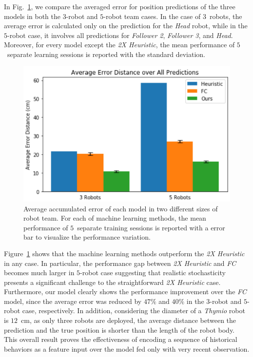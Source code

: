 \documentclass[letterpaper, 10 pt, conference]{ieeeconf}  %
\begin{document}
    In Fig.~\ref{fig:macro_eval}, we compare the averaged error for
    position predictions of the three models in both the $3$-robot and
    $5$-robot team cases. In the case of $3$~robots, the average error
    is calculated only on the prediction for the \emph{Head} robot,
    while in the $5$-robot case, it involves all predictions for
    \emph{Follower 2}, \emph{Follower 3}, and \emph{Head}. Moreover, for
    every model except the \emph{2X Heuristic}, the mean performance of
    $5$~separate learning sessions is reported with the standard
    deviation.
	\begin{figure}[t]
        \centering
        \includegraphics[width=1.\columnwidth]{fig_macro_eval}
        \caption{Average accumulated error of each model in two different sizes of robot team.
            For each of machine learning methods, the mean performance of $5$~separate training
            sessions is reported with a error bar to visualize the performance variation.
        }
        \label{fig:macro_eval}
	\end{figure}

    Figure~\ref{fig:macro_eval} shows that the machine learning methods
    outperform the \emph{2X Heuristic} in any case. In particular, the
    performance gap between \emph{2X Heuristic} and \emph{FC} becomes
    much larger in $5$-robot case suggesting that realistic
    stochasticity presents a significant challenge to the
    straightforward \emph{2X Heuristic} case. Furthermore, our model
    clearly shows the performance improvement over the \emph{FC} model,
    since the average error was reduced by $47\%$ and $40\%$ in the
    $3$-robot and $5$-robot case, respectively. In addition, considering
    the diameter of a \emph{Thymio} robot is $12$~cm, as only three
    robots are deployed, the average distance between the prediction and
    the true position is shorter than the length of the robot body. This
    overall result proves the effectiveness of encoding a sequence of
    historical behaviors as a feature input over the model fed only with
    very recent observation.
\end{document}
